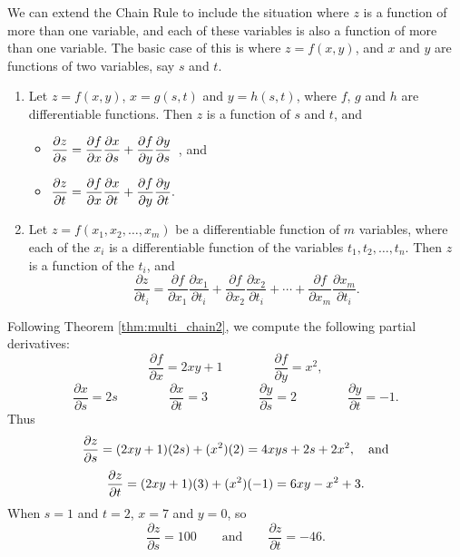 We can extend the Chain Rule to include the situation where $z$ is a function of more than one variable, and each of these variables is also a function of more than one variable. The basic case of this is where $z=f(x,y)$, and $x$ and $y$ are functions of two variables, say $s$ and $t$. \\

{\begin{enumerate}
	\item Let $z=f(x,y)$, $x=g(s,t)$ and $y=h(s,t)$, where $f$, $g$ and $h$ are differentiable functions. Then $z$ is a function of $s$ and $t$, and
		\begin{itemize}
			\item $\displaystyle \frac{\partial z}{\partial s} = \frac{\partial f}{\partial x}\frac{\partial x}{\partial s} + \frac{\partial f}{\partial y}\frac{\partial y}{\partial s}$\ , \quad and 
			\item $\displaystyle \frac{\partial z}{\partial t} = \frac{\partial f}{\partial x}\frac{\partial x}{\partial t} + \frac{\partial f}{\partial y}\frac{\partial y}{\partial t}.$
		\end{itemize}
		
		\item		Let $z = f(x_1,x_2,\ldots,x_m)$ be a differentiable function of $m$ variables, where each of the $x_i$ is a differentiable function of the variables $t_1,t_2,\ldots,t_n$. Then $z$ is a function of the $t_i$, and 
		$$\frac{\partial z}{\partial t_i} = \frac{\partial f}{\partial x_1}\frac{\partial x_1}{\partial t_i} + \frac{\partial f}{\partial x_2}\frac{\partial x_2}{\partial t_i} + \cdots +  \frac{\partial f}{\partial x_m}\frac{\partial x_m}{\partial t_i}.$$
\end{enumerate}
}

{Following Theorem \ref{thm:multi_chain2}, we compute the following partial derivatives:
$$\frac{\partial f}{\partial x} = 2xy+1\qquad\qquad \frac{\partial f}{\partial y} = x^2,$$
$$\frac{\partial x}{\partial s} = 2s \qquad\qquad \frac{\partial x}{\partial t} = 3\qquad\qquad \frac{\partial y}{\partial s} = 2 \qquad\qquad \frac{\partial y}{\partial t} = -1.$$
Thus 
$$\displaystyle \frac{\partial z}{\partial s} = (2xy+1)(2s) + (x^2)(2) = 4xys+2s + 2x^2,\quad \text{and}$$
$$\displaystyle \frac{\partial z}{\partial t} = (2xy+1)(3) + (x^2)(-1) = 6xy-x^2+3.$$
When $s=1$ and $t=2$, $x= 7$ and $y= 0$, so 
$$\frac{\partial z}{\partial s} = 100\qquad \text{and}\qquad \frac{\partial z}{\partial t} = -46.$$
\baselineskip}\\

